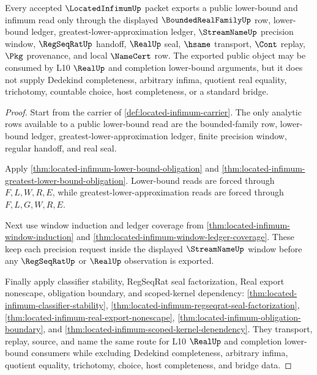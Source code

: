 \begin{theorem}
\label{thm:located-infimum-public-export}
Every accepted $\LocatedInfimumUp$ packet exports a public lower-bound and infimum read only through the displayed $\BoundedRealFamilyUp$ row, lower-bound ledger, greatest-lower-approximation ledger, $\StreamNameUp$ precision window, $\RegSeqRatUp$ handoff, $\RealUp$ seal, $\hsame$ transport, $\Cont$ replay, $\Pkg$ provenance, and local $\NameCert$ row. The exported public object may be consumed by L10 $\RealUp$ and completion lower-bound arguments, but it does not supply Dedekind completeness, arbitrary infima, quotient real equality, trichotomy, countable choice, host completeness, or a standard bridge.
\end{theorem}
\begin{proof}
Start from the carrier of \autoref{def:located-infimum-carrier}. The only analytic rows available to a public lower-bound read are the bounded-family row, lower-bound ledger, greatest-lower-approximation ledger, finite precision window, regular handoff, and real seal.

Apply \autoref{thm:located-infimum-lower-bound-obligation} and \autoref{thm:located-infimum-greatest-lower-bound-obligation}. Lower-bound reads are forced through $F,L,W,R,E$, while greatest-lower-approximation reads are forced through $F,L,G,W,R,E$.

Next use window induction and ledger coverage from \autoref{thm:located-infimum-window-induction} and \autoref{thm:located-infimum-window-ledger-coverage}. These keep each precision request inside the displayed $\StreamNameUp$ window before any $\RegSeqRatUp$ or $\RealUp$ observation is exported.

Finally apply classifier stability, RegSeqRat seal factorization, Real export nonescape, obligation boundary, and scoped-kernel dependency: \autoref{thm:located-infimum-classifier-stability}, \autoref{thm:located-infimum-regseqrat-seal-factorization}, \autoref{thm:located-infimum-real-export-nonescape}, \autoref{thm:located-infimum-obligation-boundary}, and \autoref{thm:located-infimum-scoped-kernel-dependency}. They transport, replay, source, and name the same route for L10 $\RealUp$ and completion lower-bound consumers while excluding Dedekind completeness, arbitrary infima, quotient equality, trichotomy, choice, host completeness, and bridge data.
\end{proof}

